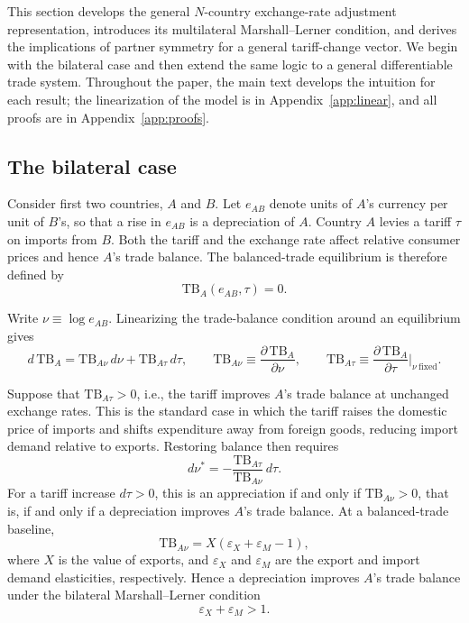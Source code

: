 \documentclass[11pt]{article}
\begin{document}
This section develops the general $N$-country exchange-rate adjustment representation, introduces its multilateral Marshall--Lerner condition, and derives the implications of partner symmetry for a general tariff-change vector. We begin with the bilateral case and then extend the same logic to a general differentiable trade system. Throughout the paper, the main text develops the intuition for each result; the linearization of the model is in Appendix~\ref{app:linear}, and all proofs are in Appendix~\ref{app:proofs}.

\subsection{The bilateral case}
\label{sec:bilateral}

Consider first two countries, $A$ and $B$. Let $e_{AB}$ denote units of $A$'s currency per unit of $B$'s, so that a rise in $e_{AB}$ is a depreciation of $A$. Country $A$ levies a tariff $\tau$ on imports from $B$. Both the tariff and the exchange rate affect relative consumer prices and hence $A$'s trade balance. The balanced-trade equilibrium is therefore defined by
\[
\mathrm{TB}_A(e_{AB},\tau)=0.
\]

Write $\nu\equiv\log e_{AB}$. Linearizing the trade-balance condition around an equilibrium gives
\begin{equation}
d\,\mathrm{TB}_A
=
\mathrm{TB}_{A\nu}\,d\nu
+
\mathrm{TB}_{A\tau}\,d\tau,
\qquad
\mathrm{TB}_{A\nu}\equiv\frac{\partial\,\mathrm{TB}_A}{\partial\nu},
\qquad
\mathrm{TB}_{A\tau}\equiv
\frac{\partial\,\mathrm{TB}_A}{\partial\tau}\bigg|_{\nu\ \mathrm{fixed}} .
\label{eq:bilat}
\end{equation}

Suppose that $\mathrm{TB}_{A\tau}>0$, i.e., the tariff improves $A$'s trade balance at unchanged exchange rates. This is the standard case in which the tariff raises the domestic price of imports and shifts expenditure away from foreign goods, reducing import demand relative to exports. Restoring balance then requires
\begin{equation}
d\nu^{\ast}=-\frac{\mathrm{TB}_{A\tau}}{\mathrm{TB}_{A\nu}}\,d\tau .
\label{eq:bilat-slope}
\end{equation}
For a tariff increase $d\tau>0$, this is an appreciation if and only if $\mathrm{TB}_{A\nu}>0$, that is, if and only if a depreciation improves $A$'s trade balance. At a balanced-trade baseline,
\[
\mathrm{TB}_{A\nu}=X\left(\varepsilon_X+\varepsilon_M-1\right),
\]
where $X$ is the value of exports, and $\varepsilon_X$ and $\varepsilon_M$ are the export and import demand elasticities, respectively. Hence a depreciation improves $A$'s trade balance under the bilateral Marshall--Lerner condition
\begin{equation}
\varepsilon_X+\varepsilon_M>1.
\label{eq:ML-bilateral}
\end{equation}
\end{document}
